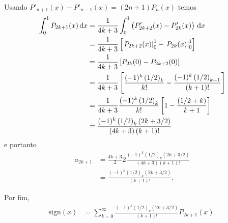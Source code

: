 \documentclass[a4paper,12pt, leqno, answers]{exam}
\begin{document}
\begin{questions}
\begin{solution}
        Usando $P'_{n + 1}(x) - P'_{n-1}(x) = \left( 2n + 1 \right) P_n(x)$ temos
        \begin{align*}
            \int_0^1 P_{2k + 1}(x) \, \mathrm{d}x &= \frac{1}{4k + 3} \int_0^1 \left( P'_{2k + 2}(x) - P'_{2k}(x) \right) \, \mathrm{d}x \\
            &= \frac{1}{4k + 3} \left[ \left. P_{2k+2}(x) \right|_0^1 - \left. P_{2k}(x) \right|_0^1 \right] \\
            &= \frac{1}{4k + 3} \left[ P_{2k}(0) - P_{2k + 2}(0) \right] \\
            &= \frac{1}{4k + 3} \left[ \frac{(-1)^k \left( 1/2 \right)_k}{k!} - \frac{(-1)^k \left( 1/2 \right)_{k + 1}}{\left( k + 1 \right)!} \right] \\
            &= \frac{1}{4k + 3} \frac{(-1)^k \left( 1/2 \right)_k}{k!} \left[ 1 - \frac{\left( 1/2 + k \right)}{k + 1} \right] \\
            &= \frac{(-1)^k \left( 1/2 \right)_k \left( 2k + 3/2 \right)}{\left( 4k + 3 \right) \left( k + 1 \right)!}
        \end{align*}
        e portanto
        \begin{align*}
            a_{2k + 1} &= \frac{4 k + 3}{2} 2 \frac{(-1)^k \left( 1/2 \right)_k \left( 2k + 3/2 \right)}{\left( 4k + 3 \right) \left( k + 1 \right)!} \\
            &= \frac{(-1)^k \left( 1/2 \right)_k \left( 2k + 3/2 \right)}{\left( k + 1 \right)!}.
        \end{align*}
        
        Por fim,
        \begin{align*}
            \text{sign}(x) &= \sum_{k = 0}^\infty \frac{(-1)^k \left( 1/2 \right)_k \left( 2k + 3/2 \right)}{\left( k + 1 \right)!} P_{2k + 1}(x).
        \end{align*}
    \end{solution}


\end{questions}
\end{document}
